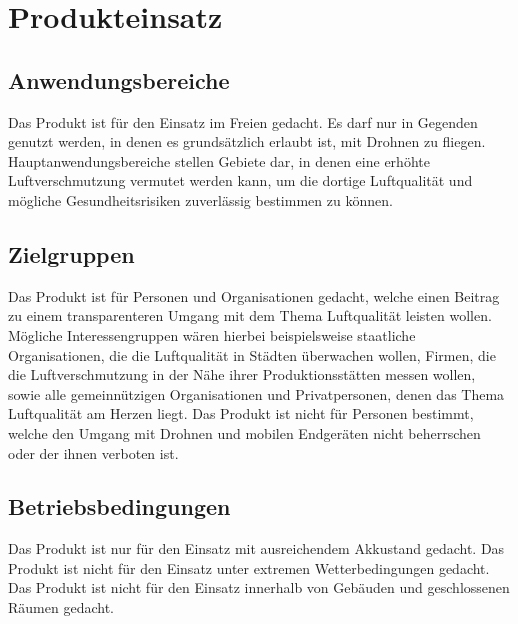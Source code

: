 


\chapter{Produkteinsatz}\label{cha:Produkteinsatz}

\section{Anwendungsbereiche}\label{sec:Anwendungsbereiche}

Das Produkt ist für den Einsatz im Freien gedacht. Es darf nur in Gegenden genutzt werden, in denen es grundsätzlich erlaubt ist, mit Drohnen zu fliegen.
Hauptanwendungsbereiche stellen Gebiete dar, in denen eine erhöhte Luftverschmutzung vermutet werden kann, um die dortige Luftqualität und mögliche Gesundheitsrisiken zuverlässig bestimmen zu können.


\section{Zielgruppen}\label{sec:Zielgruppen}

Das Produkt ist für Personen und Organisationen gedacht, welche einen Beitrag zu einem transparenteren Umgang mit dem Thema Luftqualität leisten wollen. Mögliche Interessengruppen wären hierbei beispielsweise staatliche Organisationen, die die Luftqualität in Städten überwachen wollen, Firmen, die die Luftverschmutzung in der Nähe ihrer Produktionsstätten messen wollen, sowie alle gemeinnützigen Organisationen und Privatpersonen, denen das Thema Luftqualität am Herzen liegt. 
Das Produkt ist nicht für Personen bestimmt, welche den Umgang mit Drohnen und mobilen Endgeräten nicht beherrschen oder der ihnen verboten ist.

\section{Betriebsbedingungen}\label{sec:Betriebsbedingungen}

Das Produkt ist nur für den Einsatz mit ausreichendem Akkustand gedacht. Das Produkt ist nicht für den Einsatz unter extremen Wetterbedingungen gedacht. Das Produkt ist nicht für den Einsatz innerhalb von Gebäuden und geschlossenen Räumen gedacht. 